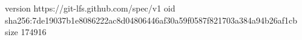 version https://git-lfs.github.com/spec/v1
oid sha256:7de19037b1e8086222ac8d04806446af30a59f0587f821703a384a94b26af1cb
size 174916
